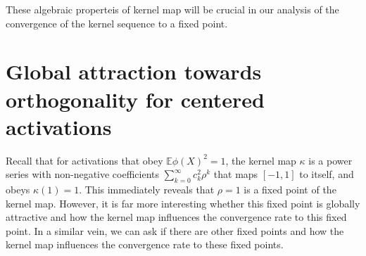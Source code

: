 \documentclass[twoside]{article}
\newcommand{\E}{\mathbb{E}}
\theoremstyle{definition}
\newcommand{\thomas}[1]{{\color{blue}TH:  \textit{#1}}}
\begin{document}
These algebraic properteis of kernel map will be crucial in our analysis of the convergence of the kernel sequence to a fixed point. 





\section{Global attraction towards orthogonality for centered activations}

Recall that for activations that obey $\E \phi(X)^2 = 1$, the kernel map  $\kappa$ is a power series with non-negative coefficients $\sum_{k=0}^\infty c_k^2 \rho^k$ that maps $[-1,1]$ to itself, and obeys $\kappa(1)=1.$ This immediately reveals that $\rho=1$ is a fixed point of the kernel map. 
However, it is far more interesting whether this fixed point is globally attractive and how the kernel map influences the convergence rate to this fixed point. In a similar vein, we can ask if there are other fixed points and how the kernel map influences the convergence rate to these fixed points.
\end{document}
